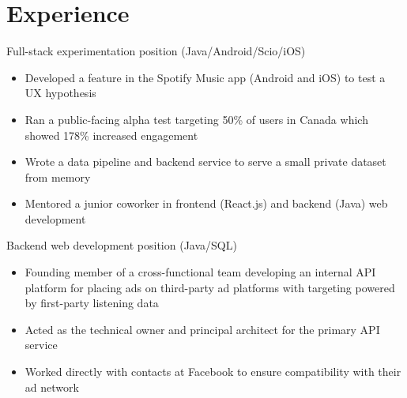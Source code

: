 



\makecvtitle


\section{Experience}
	{Full-stack experimentation position (Java/Android/Scio/iOS)}{
	\begin{itemize}
	\item Developed a feature in the Spotify Music app (Android and iOS) to test a UX hypothesis
	\item Ran a public-facing alpha test targeting 50\% of users in Canada which showed 178\% increased engagement
	\item Wrote a data pipeline and backend service to serve a small private dataset from memory
	\item Mentored a junior coworker in frontend (React.js) and backend (Java) web development
	\end{itemize}
	}
	{Backend web development position (Java/SQL)}{
	\begin{itemize}
	\item Founding member of a cross-functional team developing an internal API platform for placing ads on third-party ad platforms with targeting powered by first-party listening data
	\item Acted as the technical owner and principal architect for the primary API service
	\item Worked directly with contacts at Facebook to ensure compatibility with their ad network
	\end{itemize}
}

